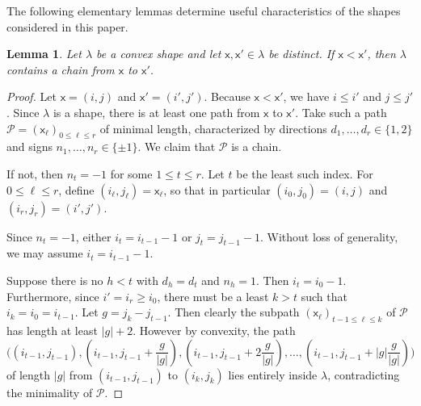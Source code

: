 \documentclass[12pt]{amsart}
\newcommand{\x}{\ensuremath{\mathsf{x}}}
\newtheorem{lemma}[theorem]{Lemma}
\theoremstyle{definition}
\theoremstyle{remark}
\numberwithin{equation}{section}
\begin{document}
The following elementary lemmas determine useful characteristics of the shapes considered in this paper. 

\begin{lemma} \label{lem:convex_chain}
Let $\lambda$ be a convex shape and let $\x,\x' \in \lambda$ be distinct. If $\x < \x'$, then $\lambda$ contains a chain from $\x$ to $\x'$. 
\end{lemma}

\begin{proof} 
Let $\x = (i,j)$ and $\x' = (i',j')$. Because $\x < \x'$, we have $i \leq i'$ and $j \leq j'$. Since $\lambda$ is a shape, there is at least one path from $\x$ to $\x'$. Take such a path $\mathscr{P} = (\x_{\ell})_{0\leq \ell \leq r}$ of minimal length, characterized by directions $d_1, \ldots, d_r \in \{ 1,2 \}$ and signs $n_1, \ldots, n_r \in \{ \pm 1\}$.  We claim that $\mathscr{P}$ is a chain. 

If not, then $n_t  = -1$ for some $1 \leq t \leq r$. Let $t$ be the least such index. For  $0 \leq \ell \leq r$, define $(i_\ell, j_\ell) = \x_\ell$, so that in particular $(i_0, j_0) = (i,j)$ and $(i_r, j_r) = (i',j')$.


Since $n_t = -1$, either $i_t = i_{t-1} -1$ or $j_t = j_{t-1} -1$.  Without loss of generality, we may assume $i_t = i_{t-1} -1$. 

Suppose there is no $h < t$ with $d_h = d_t$ and $n_h = 1$. Then $i_t = i_0 - 1$. Furthermore, since $i' = i_r \geq i_0$, there must be a least $k > t$ such that $i_k = i_0 = i_{t-1}$. Let $g = j_k - j_{t-1} $. Then clearly the subpath $(\x_{\ell})_{t-1\leq \ell \leq k}$ of $\mathscr{P}$ has length at least $|g| + 2$.
However by convexity, the path 
\[
\bigg( (i_{t-1}, j_{t-1}),   (i_{t-1}, j_{t-1} + \frac{g}{|g|}), (i_{t-1}, j_{t-1} + 2\frac{g}{|g|}), \dots , (i_{t-1}, j_{t-1} + |g|\frac{g}{|g|}) \bigg)
\]
of length $|g|$ from $(i_{t-1}, j_{t-1})$ to $(i_k, j_k)$ lies entirely inside $\lambda$, contradicting the minimality of $\mathscr{P}$.


\end{proof}
\end{document}
